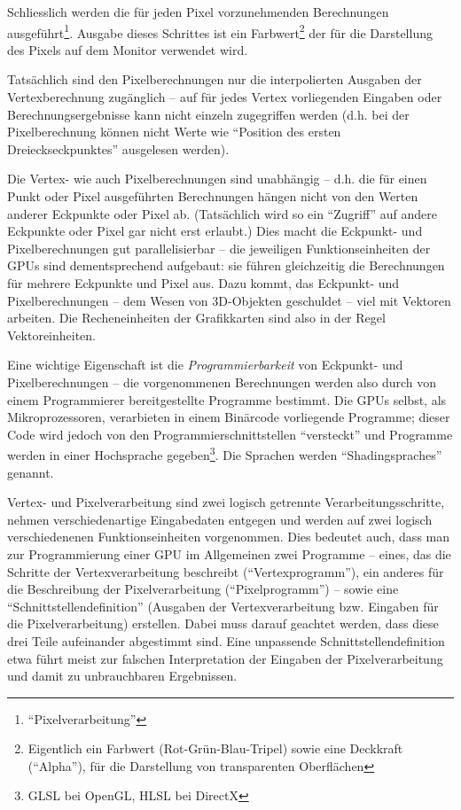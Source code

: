 \documentclass[twoside,a4paper,fleqn,12pt]{book}
\begin{document}
Schliesslich werden die für jeden Pixel vorzunehmenden Berechnungen ausgeführt\footnote{"`Pixelverarbeitung"'}.
Ausgabe dieses Schrittes ist ein Farbwert\footnote{Eigentlich ein Farbwert (Rot-Grün-Blau-Tripel) sowie eine Deckkraft ("`Alpha"'), für die Darstellung von transparenten Oberflächen}
der für die Darstellung des Pixels auf dem Monitor verwendet wird.

Tatsächlich sind den Pixelberechnungen nur die interpolierten Ausgaben der Vertexberechnung zugänglich -- auf für jedes Vertex vorliegenden
Eingaben oder Berechnungsergebnisse kann nicht einzeln zugegriffen werden (d.h. bei der Pixelberechnung können nicht Werte wie
"`Position des ersten Dreieckseckpunktes"' ausgelesen werden).

Die Vertex- wie auch Pixelberechnungen sind unabhängig -- d.h. die für einen Punkt oder Pixel ausgeführten Berechnungen hängen
nicht von den Werten anderer Eckpunkte oder Pixel ab. (Tatsächlich wird so ein "`Zugriff"' auf andere Eckpunkte oder Pixel gar nicht erst erlaubt.)
Dies macht die Eckpunkt- und Pixelberechnungen gut parallelisierbar -- die jeweiligen Funktionseinheiten der GPUs sind dementsprechend aufgebaut:
sie führen gleichzeitig die Berechnungen für mehrere Eckpunkte und Pixel aus.
Dazu kommt, das Eckpunkt- und Pixelberechnungen -- dem Wesen von 3D-Objekten geschuldet -- viel mit Vektoren arbeiten. Die Recheneinheiten
der Grafikkarten sind also in der Regel Vektoreinheiten.

Eine wichtige Eigenschaft ist die \emph{Programmierbarkeit} von Eckpunkt- und Pixelberechnungen
-- die vorgenommenen Berechnungen werden also durch von einem Programmierer bereitgestellte
Programme bestimmt. Die GPUs selbst, als Mikroprozessoren, verarbieten in einem Binärcode vorliegende Programme; dieser Code
wird jedoch von den Programmierschnittstellen "`versteckt"' und Programme werden in einer Hochsprache gegeben\footnote{GLSL bei OpenGL, HLSL bei DirectX}.
Die Sprachen werden "`\glspl{Shadingsprache}"' genannt.

Vertex- und Pixelverarbeitung sind zwei logisch getrennte Verarbeitungsschritte, nehmen verschiedenartige Eingabedaten entgegen und
werden auf zwei logisch verschiedenenen Funktionseinheiten vorgenommen. Dies bedeutet auch, dass man zur Programmierung einer GPU
im Allgemeinen zwei Programme -- eines, das die Schritte der Vertexverarbeitung beschreibt ("`Vertexprogramm"'),
ein anderes für die Beschreibung der Pixelverarbeitung ("`Pixelprogramm"')
-- sowie eine "`Schnittstellendefinition"' (Ausgaben der Vertexverarbeitung bzw. Eingaben für die Pixelverarbeitung) erstellen.
Dabei muss darauf geachtet werden, dass diese drei Teile aufeinander abgestimmt sind. Eine unpassende Schnittstellendefinition etwa
führt meist zur falschen Interpretation der Eingaben der Pixelverarbeitung und damit zu unbrauchbaren Ergebnissen.
\end{document}
